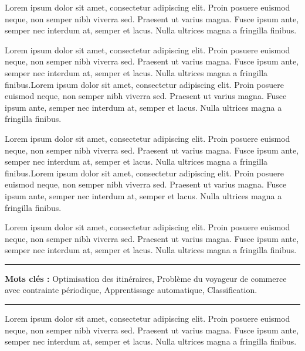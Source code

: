 
Lorem ipsum dolor sit amet, consectetur adipiscing elit. Proin posuere euismod neque, non semper nibh viverra sed. Praesent ut varius magna. Fusce ipsum ante, semper nec interdum at, semper et lacus. Nulla ultrices magna a fringilla finibus.

\medskip

Lorem ipsum dolor sit amet, consectetur adipiscing elit. Proin posuere euismod neque, non semper nibh viverra sed. Praesent ut varius magna. Fusce ipsum ante, semper nec interdum at, semper et lacus. Nulla ultrices magna a fringilla finibus.Lorem ipsum dolor sit amet, consectetur adipiscing elit. Proin posuere euismod neque, non semper nibh viverra sed. Praesent ut varius magna. Fusce ipsum ante, semper nec interdum at, semper et lacus. Nulla ultrices magna a fringilla finibus.

\medskip

Lorem ipsum dolor sit amet, consectetur adipiscing elit. Proin posuere euismod neque, non semper nibh viverra sed. Praesent ut varius magna. Fusce ipsum ante, semper nec interdum at, semper et lacus. Nulla ultrices magna a fringilla finibus.Lorem ipsum dolor sit amet, consectetur adipiscing elit. Proin posuere euismod neque, non semper nibh viverra sed. Praesent ut varius magna. Fusce ipsum ante, semper nec interdum at, semper et lacus. Nulla ultrices magna a fringilla finibus.

\medskip

Lorem ipsum dolor sit amet, consectetur adipiscing elit. Proin posuere euismod neque, non semper nibh viverra sed. Praesent ut varius magna. Fusce ipsum ante, semper nec interdum at, semper et lacus. Nulla ultrices magna a fringilla finibus.

\vspace{1cm}

\noindent\rule[2pt]{\textwidth}{0.5pt}

{\textbf{Mots clés :}}
Optimisation des itinéraires, Problème du voyageur de commerce avec contrainte périodique, Apprentissage automatique, Classification.
\\
\noindent\rule[2pt]{\textwidth}{0.5pt}

\clearpage


Lorem ipsum dolor sit amet, consectetur adipiscing elit. Proin posuere euismod neque, non semper nibh viverra sed. Praesent ut varius magna. Fusce ipsum ante, semper nec interdum at, semper et lacus. Nulla ultrices magna a fringilla finibus.

